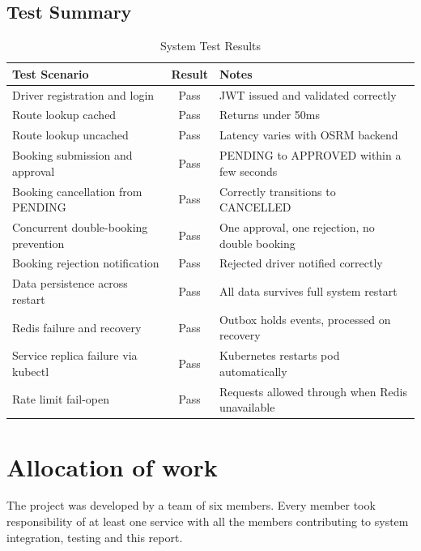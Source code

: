 \documentclass{article}
\begin{document}
\subsection{Test Summary}
\begin{table}[h!]
\centering
\begin{tabular}{|p{6cm}|c|p{7cm}|}
\hline
\textbf{Test Scenario} & \textbf{Result} & \textbf{Notes} \\
\hline
Driver registration and login & Pass & JWT issued and validated correctly \\
\hline
Route lookup cached & Pass & Returns under 50ms \\
\hline
Route lookup uncached & Pass & Latency varies with OSRM backend \\
\hline
Booking submission and approval & Pass & PENDING to APPROVED within a few seconds \\
\hline
Booking cancellation from PENDING & Pass & Correctly transitions to CANCELLED \\
\hline
Concurrent double-booking prevention & Pass & One approval, one rejection, no double booking \\
\hline
Booking rejection notification & Pass & Rejected driver notified correctly \\
\hline
Data persistence across restart & Pass & All data survives full system restart \\
\hline
Redis failure and recovery & Pass & Outbox holds events, processed on recovery \\
\hline
Service replica failure via kubectl & Pass & Kubernetes restarts pod automatically \\
\hline
Rate limit fail-open & Pass & Requests allowed through when Redis unavailable \\
\hline
\end{tabular}
\caption{System Test Results}
\label{tab:test_results}
\end{table}

\section{Allocation of work}
The project was developed by a team of six members. Every member took responsibility of at least one service with all the members contributing to system integration, testing and this report.
\end{document}
